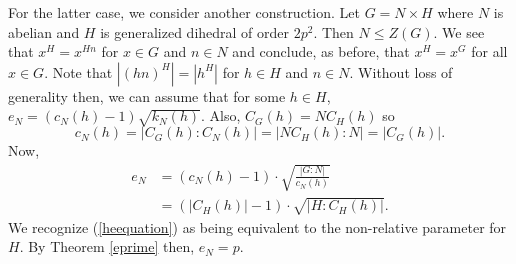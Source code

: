 \documentclass[main.tex]{subfiles}
\begin{document}
For the latter case, we consider another construction. Let $G = N \times H$ where $N$ is abelian and $H$ is generalized dihedral of order $2p^2$. Then $N \le Z(G)$. We see that $x^H = x^{Hn}$ for $x \in G$ and $n \in N$ and conclude, as before, that $x^H = x^G$ for all $x \in G$. Note that $|(hn)^H| = |h^H|$ for $h \in H$ and $n \in N$. Without loss of generality then, we can assume that for some $h \in H$, $e_N = (c_N(h) - 1) \sqrt{k_N(h)}$. Also, $C_G(h) = N C_H(h)$ so
$$c_N(h) = |C_G(h) : C_N(h)| = |N C_H(h) : N| = |C_G(h)| \text{.}$$
Now,
\begin{align}
e_N &= (c_N(h) - 1) \cdot \sqrt{\frac{|G:N|}{c_N(h)}}\nonumber \\
&= (|C_H(h)| - 1) \cdot \sqrt{|H : C_H(h)|}\label{heequation} \text{.}
\end{align}
We recognize (\ref{heequation}) as being equivalent to the non-relative parameter for $H$. By Theorem \ref{eprime} then, $e_N = p$.
\end{document}

